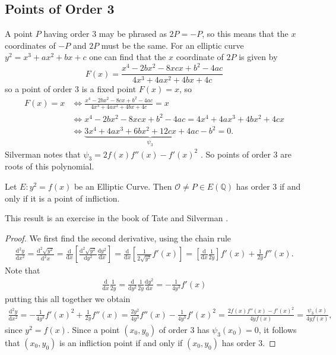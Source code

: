 \subsection{Points of Order 3}%
\label{sub:points_of_order_3}
A point $P$ having order $3$ may be phrased as $2P = -P$,
so this means that the $x$ coordinates of $-P$ and $2P$ must be the same.
For an elliptic curve $y^2 = x^3 + ax^2 + bx + c$
one can find that the $x$ coordinate of $2P$ is given by
\begin{equation} \label{eq:xcord2p}
  F(x) = \frac{x^4 -2bx^2 - 8xcx + b^2 - 4ac}{4x^3+4ax^2 + 4bx+4c}
\end{equation}
so a point of order 3 is a fixed point $F(x) = x$, so
\begin{align*}
  F(x) = x &\iff \frac{x^4 -2bx^2 -8cx + b^2 - 4ac}{4x^3+4ax^2 + 4bx+4c} = x \\
           &\iff x^4 -2bx^2 -8xcx + b^2 - 4ac = 4x^4+4ax^3 + 4bx^2+4cx \\
           &\iff \underbrace{3x^{4} + 4ax^3 + 6bx^2 + 12 cx + 4ac - b^2}_{\psi_3} = 0.
\end{align*}
Silverman notes that $\psi_3 = 2f(x)f''(x) - f'(x)^2$ \cite[section 2.1]{silvermanRationalPoints}.
So points of order 3 are roots of this polynomial.
\begin{theorem} \label{thm:inflictionOrder3}
  Let $E: y^2 = f(x)$ be an Elliptic Curve.
  Then $\mathcal{O} \neq P \in E(\mathbb{Q})$ has order 3
  if and only if it is a point of infliction.
\end{theorem}
This result is an exercise in the book of Tate and Silverman
\cite[Exercise 2.2]{silvermanRationalPoints}.
\begin{proof}
  We first find the second derivative, using the chain rule
  \begin{align*}
    \frac{\mathrm{d}^2y}{\mathrm{d}x^2} = \frac{\mathrm{d}^2 \sqrt{y^2} }{\mathrm{d}^2 x}
    = \frac{\mathrm{d}}{\mathrm{d}x} \left[ \frac{\mathrm{d}^2 \sqrt{y^2} }{\mathrm{d}y^2} \frac{\mathrm{d}y^2}{\mathrm{d}x}   \right]
    = \frac{\mathrm{d}}{\mathrm{d}x} \left[ \frac{1}{2 \sqrt{y^2}} f'(x)   \right]
    = \left[\frac{\mathrm{d}}{\mathrm{d}x}\frac{1}{2y} \right] f'(x)
    + \frac{1}{2y} f''(x).
  \end{align*}
  Note that
  \begin{align*}
    \frac{\mathrm{d}}{\mathrm{d}x} \frac{1}{2y} = \frac{\mathrm{d}}{\mathrm{d}y^2} \frac{1}{2y} \frac{\mathrm{d}y^2}{\mathrm{d}x}
    = -\frac{1}{4 y^3} f'(x)
  \end{align*}
  putting this all together we obtain
  \begin{align*}
    \frac{\mathrm{d}^2y}{\mathrm{d}x^2} = -\frac{1}{4y^3} f'(x)^2 + \frac{1}{2y} f''(x)
    = \frac{2y^2}{4y^3} f''(x) - \frac{1}{4y^3}f'(x)^2
    = \frac{2f(x)f''(x) - f'(x)^2}{4yf(x)}
    = \frac{\psi_3(x)}{4y f(x)},
  \end{align*}
  since $y^2 = f(x)$.
  Since a point $(x_0, y_0)$ of order 3 has $\psi_3(x_0) = 0$,
  it follows that $(x_0, y_0)$ is an infliction point
  if and only if $(x_0, y_0)$ has order 3.
\end{proof}
